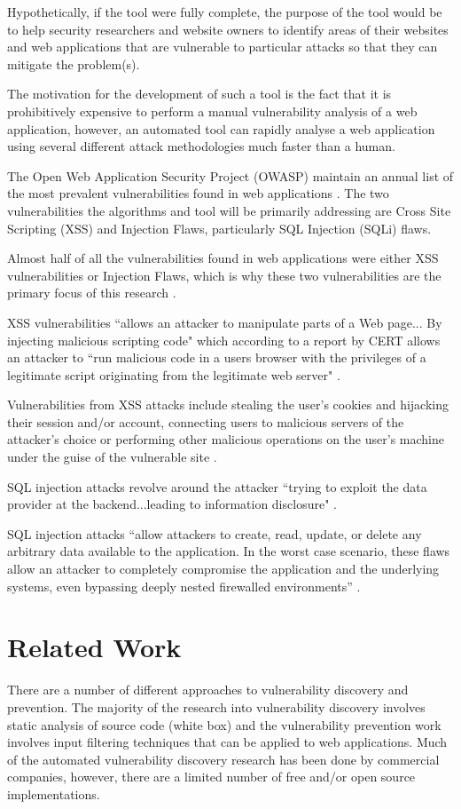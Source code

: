 \documentclass[12pt,a4paper]{article}
\begin{document}
Hypothetically, if the tool were fully complete, the purpose of the tool would be to help security researchers and website owners to identify areas of their websites and web applications that are vulnerable to particular attacks so that they can mitigate the problem(s).

The motivation for the development of such a tool is the fact that it is prohibitively expensive to perform a manual vulnerability analysis of a web application, however, an automated tool can rapidly analyse a web application using several different attack methodologies much faster than a human.

The Open Web Application Security Project (OWASP) maintain an annual list of the most prevalent vulnerabilities found in web applications \cite{OWASP:2007:Online}. The two vulnerabilities the algorithms and tool will be primarily addressing are Cross Site Scripting (XSS) and Injection Flaws, particularly SQL Injection (SQLi) flaws.

Almost half of all the vulnerabilities found in web applications were either XSS vulnerabilities or Injection Flaws, which is why these two vulnerabilities are the primary focus of this research \cite{OWASP:2007:Online}.

XSS vulnerabilities ``allows an attacker to manipulate parts of a Web page... By injecting malicious scripting code" \cite{Holz2006} which according to a report by CERT allows an attacker to ``run malicious code in a users browser with the privileges of a legitimate script originating from the legitimate web server" \cite{Rafail:2001:Online}.

Vulnerabilities from XSS attacks include stealing the user's cookies and hijacking their session and/or account, connecting users to malicious servers of the attacker's choice or performing other malicious operations on the user's machine under the guise of the vulnerable site \cite{Lee:2002:Online}.

SQL injection attacks revolve around the attacker ``trying to exploit the data provider at the backend...leading to information disclosure" \cite{Holz2006}.

SQL injection attacks “allow attackers to create, read, update, or delete any arbitrary data available to the application. In the worst case scenario, these flaws allow an attacker to completely compromise the application and the underlying systems, even bypassing deeply nested firewalled environments” \cite{OWASP:2007:Online}. 

\section{Related Work}
There are a number of different approaches to vulnerability discovery and prevention.  The majority of the research into vulnerability discovery involves static analysis of source code (white box) and the vulnerability prevention work involves input filtering techniques that can be applied to web applications.
Much of the automated vulnerability discovery research has been done by commercial companies, however, there are a limited number of free and/or open source implementations.
\end{document}
